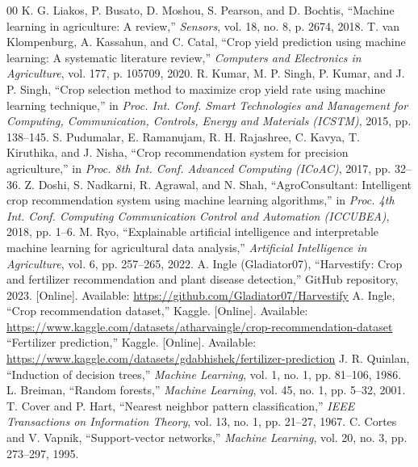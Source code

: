 \documentclass[conference]{IEEEtran}
\begin{document}
\begin{thebibliography}{00}
 K. G. Liakos, P. Busato, D. Moshou, S. Pearson, and D. Bochtis, ``Machine learning in agriculture: A review,'' \textit{Sensors}, vol. 18, no. 8, p. 2674, 2018.
 T. van Klompenburg, A. Kassahun, and C. Catal, ``Crop yield prediction using machine learning: A systematic literature review,'' \textit{Computers and Electronics in Agriculture}, vol. 177, p. 105709, 2020.
 R. Kumar, M. P. Singh, P. Kumar, and J. P. Singh, ``Crop selection method to maximize crop yield rate using machine learning technique,'' in \textit{Proc. Int. Conf. Smart Technologies and Management for Computing, Communication, Controls, Energy and Materials (ICSTM)}, 2015, pp. 138--145.
 S. Pudumalar, E. Ramanujam, R. H. Rajashree, C. Kavya, T. Kiruthika, and J. Nisha, ``Crop recommendation system for precision agriculture,'' in \textit{Proc. 8th Int. Conf. Advanced Computing (ICoAC)}, 2017, pp. 32--36.
 Z. Doshi, S. Nadkarni, R. Agrawal, and N. Shah, ``AgroConsultant: Intelligent crop recommendation system using machine learning algorithms,'' in \textit{Proc. 4th Int. Conf. Computing Communication Control and Automation (ICCUBEA)}, 2018, pp. 1--6.
 M. Ryo, ``Explainable artificial intelligence and interpretable machine learning for agricultural data analysis,'' \textit{Artificial Intelligence in Agriculture}, vol. 6, pp. 257--265, 2022.
 A. Ingle (Gladiator07), ``Harvestify: Crop and fertilizer recommendation and plant disease detection,'' GitHub repository, 2023. [Online]. Available: \url{https://github.com/Gladiator07/Harvestify}
 A. Ingle, ``Crop recommendation dataset,'' Kaggle. [Online]. Available: \url{https://www.kaggle.com/datasets/atharvaingle/crop-recommendation-dataset}
 ``Fertilizer prediction,'' Kaggle. [Online]. Available: \url{https://www.kaggle.com/datasets/gdabhishek/fertilizer-prediction} %
 J. R. Quinlan, ``Induction of decision trees,'' \textit{Machine Learning}, vol. 1, no. 1, pp. 81--106, 1986.
 L. Breiman, ``Random forests,'' \textit{Machine Learning}, vol. 45, no. 1, pp. 5--32, 2001.
 T. Cover and P. Hart, ``Nearest neighbor pattern classification,'' \textit{IEEE Transactions on Information Theory}, vol. 13, no. 1, pp. 21--27, 1967.
 C. Cortes and V. Vapnik, ``Support-vector networks,'' \textit{Machine Learning}, vol. 20, no. 3, pp. 273--297, 1995.

\end{thebibliography}
\end{document}
